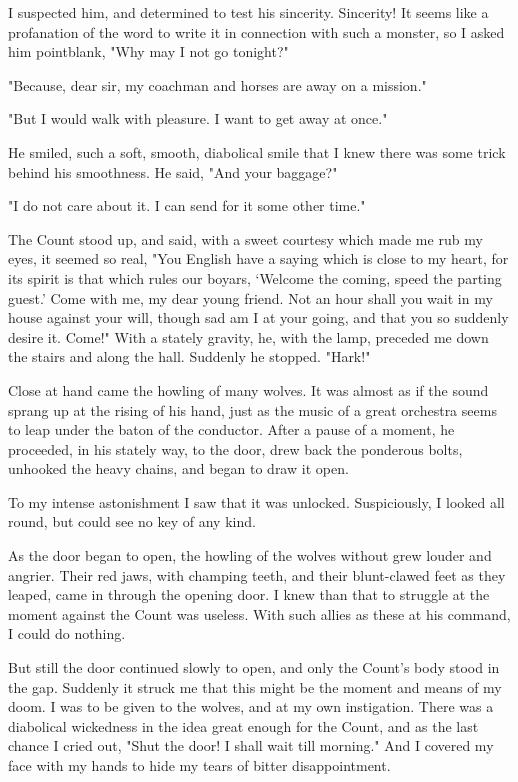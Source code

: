 I suspected him, and determined to test his sincerity. Sincerity! It seems like a profanation of the word to write it in connection with such a monster, so I asked him pointblank, "Why may I not go tonight?" 

"Because, dear sir, my coachman and horses are away on a mission." 

"But I would walk with pleasure. I want to get away at once." 

He smiled, such a soft, smooth, diabolical smile that I knew there was some trick behind his smoothness. He said, "And your baggage?" 

"I do not care about it. I can send for it some other time." 

The Count stood up, and said, with a sweet courtesy which made me rub my eyes, it seemed so real, "You English have a saying which is close to my heart, for its spirit is that which rules our boyars, `Welcome the coming, speed the parting guest.' Come with me, my dear young friend. Not an hour shall you wait in my house against your will, though sad am I at your going, and that you so suddenly desire it. Come!" With a stately gravity, he, with the lamp, preceded me down the stairs and along the hall. Suddenly he stopped. "Hark!" 

Close at hand came the howling of many wolves. It was almost as if the sound sprang up at the rising of his hand, just as the music of a great orchestra seems to leap under the baton of the conductor. After a pause of a moment, he proceeded, in his stately way, to the door, drew back the ponderous bolts, unhooked the heavy chains, and began to draw it open. 

To my intense astonishment I saw that it was unlocked. Suspiciously, I looked all round, but could see no key of any kind. 

As the door began to open, the howling of the wolves without grew louder and angrier. Their red jaws, with champing teeth, and their blunt-clawed feet as they leaped, came in through the opening door. I knew than that to struggle at the moment against the Count was useless. With such allies as these at his command, I could do nothing. 

But still the door continued slowly to open, and only the Count's body stood in the gap. Suddenly it struck me that this might be the moment and means of my doom. I was to be given to the wolves, and at my own instigation. There was a diabolical wickedness in the idea great enough for the Count, and as the last chance I cried out, "Shut the door! I shall wait till morning." And I covered my face with my hands to hide my tears of bitter disappointment. 

